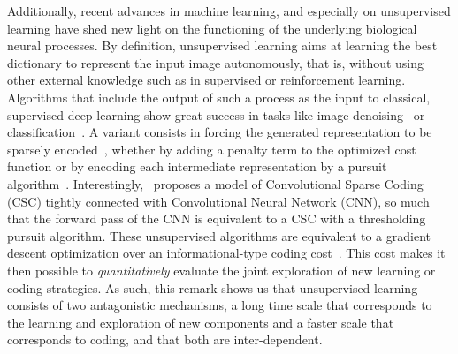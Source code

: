\documentclass[vision,article,submit,oneauthor,pdftex]{Definitions/mdpi}
\begin{document}
Additionally, recent advances in machine learning, and especially on unsupervised learning have shed new light on the functioning of the underlying biological neural processes. By definition, unsupervised learning aims at learning the best dictionary to represent the input image autonomously, that is, without using other external knowledge such as in supervised or reinforcement learning. Algorithms that include the output of such a process as the input to classical, supervised deep-learning show great success in tasks like image denoising~\citep{Vincent08} or classification~\citep{Sulam2017multi}. A variant consists in forcing the generated representation to be sparsely encoded~\citep{MakhzaniF13}, whether by adding a penalty term to the optimized cost function or by encoding each intermediate representation by a pursuit algorithm~\citep{Papyan16}. Interestingly,~\citep{Papyan16} proposes a model of Convolutional Sparse Coding (CSC) tightly connected with Convolutional Neural Network (CNN), so much that the forward pass of the CNN is equivalent to a CSC with a thresholding pursuit algorithm. These unsupervised algorithms are equivalent to a gradient descent optimization over an informational-type coding cost~\citep{Kingma13}. This cost makes it then possible to \emph{quantitatively} evaluate the joint exploration of new learning or coding strategies. As such, this remark shows us that unsupervised learning consists of two antagonistic mechanisms, a long time scale that corresponds to the learning and exploration of new components and a faster scale that corresponds to coding, and that both are inter-dependent.
\end{document}
